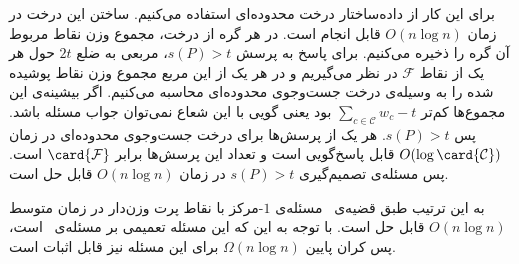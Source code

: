 برای این کار از داده‌ساختار درخت محدوده‌ای استفاده می‌کنیم. ساختن این درخت در زمان $O(n \log n)$ قابل انجام است. در هر گره از درخت، مجموع وزن نقاط مربوط آن گره را ذخیره می‌کنیم. برای پاسخ به پرسش $s(P) > t$، مربعی به ضلع $2t$ حول هر یک از نقاط $\mathcal{F}$ در نظر می‌گیریم و در هر یک از این مربع مجموع وزن نقاط پوشیده شده را به وسیله‌ی درخت جست‌وجوی محدوده‌ای محاسبه می‌کنیم. اگر بیشینه‌ی این مجموع‌ها کم‌تر
$\sum_{c \in \mathcal{C}} w_c - t$
بود یعنی گویی با این شعاع نمی‌توان جواب مسئله باشد. پس $s(P) > t$. هر یک از پرسش‌ها برای درخت جست‌وجوی محدوده‌ای در زمان $O(\log \card{\mathcal{C}})$ قابل پاسخ‌گویی است و تعداد این پرسش‌ها برابر $\card{\mathcal{F}}$ است. پس مسئله‌ی تصمیم‌گیری $s(P) > t$ در زمان $O(n \log n)$ قابل حل است.

به این ترتیب طبق قضیه‌ی~ مسئله‌ی $1$-مرکز با نقاط پرت ‌وزن‌دار در زمان متوسط $O(n \log n)$ قابل حل است. با توجه به این که این مسئله تعمیمی بر مسئله‌ی~ است، پس کران پایین $\Omega(n \log n)$ برای این مسئله نیز قابل اثبات است.
